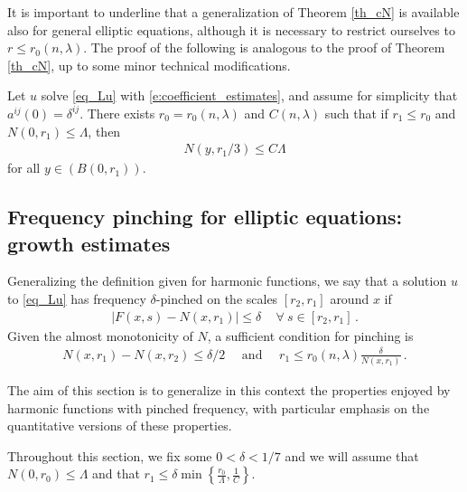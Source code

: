 \documentclass[11pt]{article}
\begin{document}
It is important to underline that a generalization of Theorem \ref{th_cN} is available also for general elliptic equations, although it is necessary to restrict ourselves to $r\leq r_0(n,\lambda)$.  The proof of the following is analogous to the proof of Theorem \ref{th_cN}, up to some minor technical modifications.

\begin{theorem}\label{th_ellcN}
 Let $u$ solve \eqref{eq_Lu} with \eqref{e:coefficient_estimates}, and assume for simplicity that $a^{ij}(0)=\delta^{ij}$. There exists $r_0=r_0(n,\lambda)$ and $C(n,\lambda)$ such that if $r_1\leq r_0$ and $N(0,r_1)\leq \Lambda$, then
 \begin{gather}
  N(y,r_1/3)\leq C\Lambda
 \end{gather}
for all $y\in (B(0,r_1))$.
\end{theorem}

\subsection{Frequency pinching for elliptic equations: growth estimates}\label{sec_lipgrowth}
Generalizing the definition given for harmonic functions, we say that a solution $u$ to \eqref{eq_Lu} has frequency $\delta$-pinched on the scales $[r_2,r_1]$ around $x$ if
\begin{gather}
 {\left|{F(x,s)-N(x,r_1)}\right|}\leq \delta\, \quad \forall\ s\in [r_2,r_1]\, .
\end{gather}
Given the almost monotonicity of $N$, a sufficient condition for pinching is
\begin{gather}
 N(x,r_1)-N(x,r_2)\leq \delta/2 \quad \text {  and  } \quad r_1\leq r_0(n,\lambda) \frac{\delta}{N(x,r_1)}\, .
\end{gather}

The aim of this section is to generalize in this context the properties enjoyed by harmonic functions with pinched frequency, with particular emphasis on the quantitative versions of these properties.

Throughout this section, we fix some $0<\delta<1/7$ and we will assume that $N(0,r_0)\leq \Lambda$ and that $r_1\leq \delta \min{\left\{{\frac{r_0}{\Lambda}, \frac{1}{C}}\right\}}$.
\end{document}
